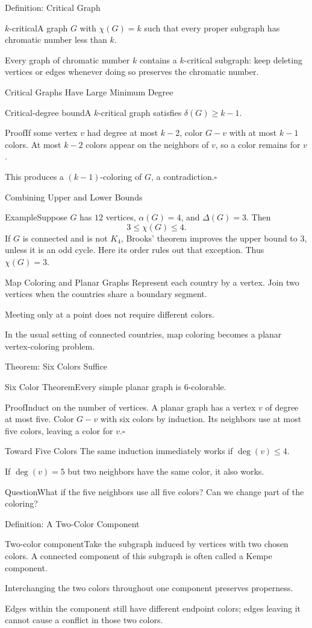 \documentclass[aspectratio=169,11pt]{beamer}
\newcommand{\Def}[2]{\begin{block}{#1}#2\end{block}}
\newcommand{\Thm}[2]{\begin{block}{#1}#2\end{block}}
\renewcommand{\Proof}[1]{\begin{block}{Proof}\normalsize #1\end{block}}
\newcommand{\Question}[1]{\begin{block}{Question}#1\end{block}}
\renewcommand{\Example}[1]{\begin{block}{Example}#1\end{block}}
\newcommand{\gap}{\par\medskip}
\begin{document}
\begin{frame}{Definition: Critical Graph}
\large
\Def{$k$-critical}{A graph $G$ with $\chi(G)=k$ such that every proper subgraph has chromatic number less than $k$.}
\gap Every graph of chromatic number $k$ contains a $k$-critical subgraph: keep deleting vertices or edges whenever doing so preserves the chromatic number.
\end{frame}
\begin{frame}{Critical Graphs Have Large Minimum Degree}
\large
\Thm{Critical-degree bound}{A $k$-critical graph satisfies $\delta(G)\ge k-1$.}
\Proof{If some vertex $v$ had degree at most $k-2$, color $G-v$ with at most $k-1$ colors. At most $k-2$ colors appear on the neighbors of $v$, so a color remains for $v$.\gap This produces a $(k-1)$-coloring of $G$, a contradiction.\hfill$\square$}
\end{frame}
\begin{frame}{Combining Upper and Lower Bounds}
\large
\Example{Suppose $G$ has $12$ vertices, $\alpha(G)=4$, and $\Delta(G)=3$. Then\[3\le\chi(G)\le4.\]If $G$ is connected and is not $K_4$, Brooks' theorem improves the upper bound to $3$, unless it is an odd cycle. Here its order rules out that exception. Thus $\chi(G)=3$.}
\end{frame}
\begin{frame}{Map Coloring and Planar Graphs}
\large
Represent each country by a vertex. Join two vertices when the countries share a boundary segment.
\gap Meeting only at a point does not require different colors.
\gap In the usual setting of connected countries, map coloring becomes a planar vertex-coloring problem.
\end{frame}
\begin{frame}{Theorem: Six Colors Suffice}
\large
\Thm{Six Color Theorem}{Every simple planar graph is $6$-colorable.}
\Proof{Induct on the number of vertices. A planar graph has a vertex $v$ of degree at most five. Color $G-v$ with six colors by induction. Its neighbors use at most five colors, leaving a color for $v$.\hfill$\square$}
\end{frame}
\begin{frame}{Toward Five Colors}
\large
The same induction immediately works if $\deg(v)\le4$.
\gap If $\deg(v)=5$ but two neighbors have the same color, it also works.
\Question{What if the five neighbors use all five colors? Can we change part of the coloring?}
\end{frame}
\begin{frame}{Definition: A Two-Color Component}
\large
\Def{Two-color component}{Take the subgraph induced by vertices with two chosen colors. A connected component of this subgraph is often called a Kempe component.}
\gap Interchanging the two colors throughout one component preserves properness.
\gap Edges within the component still have different endpoint colors; edges leaving it cannot cause a conflict in those two colors.
\end{frame}
\end{document}
